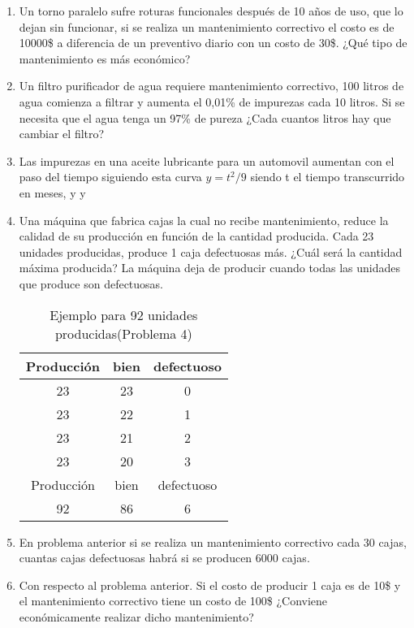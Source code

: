\documentclass[a4paper]{article}
\begin{document}
\begin{enumerate}
    

    \item Un torno paralelo sufre roturas funcionales después de 10 años de uso, que lo dejan sin funcionar, si se realiza un mantenimiento correctivo el costo es de 10000\$ a diferencia
    de un preventivo diario con un costo de 30\$. ¿Qué tipo de mantenimiento es más económico?
    \item Un filtro purificador de agua requiere mantenimiento correctivo, 
    100 litros de agua comienza a filtrar y aumenta el 0,01\% de impurezas cada 10 litros.
    Si se necesita que el agua tenga un 97\% de pureza ¿Cada cuantos litros hay que cambiar el filtro?
    \item Las impurezas en una aceite lubricante para un automovil aumentan con el paso del tiempo siguiendo esta curva $y=t^2/9$ siendo t el tiempo transcurrido en meses, y y   
    \item Una máquina que fabrica cajas la cual no recibe mantenimiento, reduce la calidad de su producción 
    en función de la cantidad producida. Cada 23 unidades producidas, produce 1 caja 
    defectuosas más. ¿Cuál será la cantidad máxima producida? La máquina deja de producir cuando 
    todas las unidades que produce son defectuosas.

    
\begin{table}
    \begin{center}
    \begin{tabular}{|c| c | c | }
        \hline       
          Producción & bien & defectuoso  \\   
        \hline  
          23 & 23 & 0 \\
          23 & 22 & 1 \\
          23 & 21 & 2 \\
          23 & 20 & 3 \\
        \hline  
        \hline
        \hline       
        Producción & bien & defectuoso  \\          
          92 & 86 & 6 \\
    \hline  
    \end{tabular}
\end{center}
    \label{Ejemplo para 92 unidades producidas}
    \caption{Ejemplo para 92 unidades producidas(Problema 4)}
\end{table}
    \item En problema anterior si se realiza un mantenimiento correctivo cada 30 cajas, cuantas cajas defectuosas habrá
    si se producen 6000 cajas.
    \item Con respecto al problema anterior. Si el costo de producir 1 caja es de 10\$ y el mantenimiento correctivo tiene un costo de 100\$ ¿Conviene económicamente realizar dicho mantenimiento? 

\end{enumerate}
\end{document}
